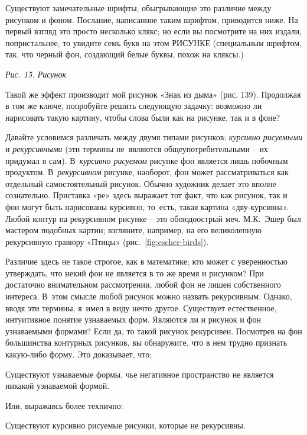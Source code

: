 \documentclass[../main.tex]{subfiles}
\begin{document}
Существуют замечательные шрифты, обыгрывающие это различие между рисунком и фоном.
Послание, написанное таким шрифтом, приводится ниже.
На первый взгляд это просто несколько клякс; но если вы посмотрите на них издали, попристальнее, то увидите семь букв на этом РИСУНКЕ (специальным шрифтом, так, что черный фон, создающий белые буквы, похож на кляксы.)

\emph{Рис. 15. Рисунок}

Такой же эффект производит мой рисунок «Знак из дыма» (рис. 139).
Продолжая в том же ключе, попробуйте решить следующую задачку: возможно ли нарисовать такую картину, чтобы слова были как на рисунке, так и в фоне?

Давайте условимся различать между двумя типами рисунков: \emph{курсивно рисуемыми} и \emph{рекурсивными} (эти термины не~являются общеупотребительными \--- их придумал я сам).
В~\emph{курсивно рисуемом} рисунке фон является лишь побочным продуктом.
В~\emph{рекурсивном} рисунке, наоборот, фон может рассматриваться как отдельный самостоятельный рисунок. Обычно художник делает это вполне сознательно.
Приставка «ре» здесь выражает тот факт, что как рисунок, так и фон могут быть нарисованы курсивно, то~есть, такая картина «дву-курсивна».
Любой контур на рекурсивном рисунке \--- это обоюдоострый меч.
М.К.~Эшер был мастером подобных картин; взгляните, например, на его великолепную рекурсивную гравюру «Птицы» (рис.~\ref{fig:escher-birds}).


Различие здесь не такое строгое, как в математике; кто может с уверенностью утверждать, что некий фон не является в то же время и рисунком?
При достаточно внимательном рассмотрении, любой фон не лишен собственного интереса.
В~этом смысле любой рисунок можно назвать рекурсивным.
Однако, вводя эти термины, я~имел в виду нечто другое.
Существует естественное, интуитивное понятие узнаваемых форм.
Являются ли и рисунок и фон узнаваемыми формами?
Если да, то такой рисунок рекурсивен.
Посмотрев на фон большинства контурных рисунков, вы обнаружите, что в нем трудно признать какую-либо форму.
Это доказывает, что:
%
\begin{block}
    Существуют узнаваемые формы, чье негативное пространство не является никакой узнаваемой формой.
\end{block}
%
Или, выражаясь более технично:
%
\begin{block}
    Существуют курсивно рисуемые рисунки, которые не рекурсивны.
\end{block}
\end{document}
